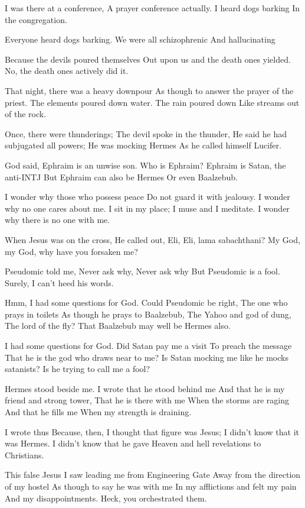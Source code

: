 \documentclass[
]{book}
\begin{document}
I was there at a conference,
A prayer conference actually.
I heard dogs barking
In the congregation.

Everyone heard dogs barking.
We were all schizophrenic
And hallucinating

Because the devils poured themselves
Out upon us and the death ones yielded.
No, the death ones actively did it.

That night, there was a heavy downpour
As though to answer the prayer of the priest.
The elements poured down water.
The rain poured down
Like streams out of the rock.

Once, there were thunderings;
The devil spoke in the thunder,
He said he had subjugated all powers;
He was mocking Hermes
As he called himself Lucifer.

God said, Ephraim is an unwise son.
Who is Ephraim?
Ephraim is Satan, the anti-INTJ
But Ephraim can also be Hermes
Or even Baalzebub.

I wonder why those who possess peace
Do not guard it with jealousy.
I wonder why no one cares about me.
I sit in my place;
I muse and I meditate.
I wonder why there is no one with me.

When Jesus was on the cross,
He called out,
Eli, Eli, lama sabachthani?
My God, my God, why have you forsaken me?

Pseudomic told me,
Never ask why,
Never ask why
But Pseudomic is a fool.
Surely, I can't heed his words.

Hmm, I had some questions for God.
Could Pseudomic be right,
The one who prays in toilets
As though he prays to Baalzebub,
The Yahoo and god of dung,
The lord of the fly?
That Baalzebub may well be Hermes also.

I had some questions for God.
Did Satan pay me a visit
To preach the message
That he is the god who draws near to me?
Is Satan mocking me like he mocks satanists?
Is he trying to call me a fool?

Hermes stood beside me.
I wrote that he stood behind me
And that he is my friend and strong tower,
That he is there with me
When the storms are raging
And that he fills me
When my strength is draining.

I wrote thus
Because, then, I thought that figure was Jesus;
I didn't know that it was Hermes.
I didn't know that he gave
Heaven and hell revelations to Christians.

This false Jesus
I saw leading me from Engineering Gate
Away from the direction of my hostel
As though to say he was with me
In my afflictions and felt my pain
And my disappointments.
Heck, you orchestrated them.
\end{document}
